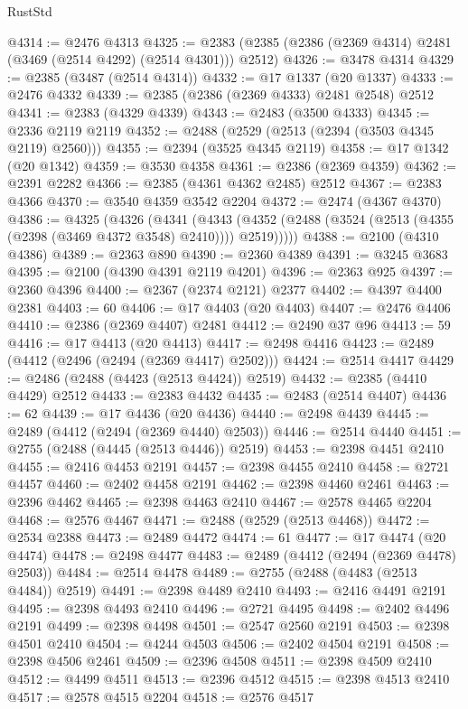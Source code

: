 \begin{lexlean}{RustStd}
\begin{coremodule}
@4314 := @2476 @4313
@4325 := @2383 (@2385 (@2386 (@2369 @4314) @2481 (@3469 (@2514 @4292) (@2514 @4301))) @2512)
@4326 := @3478 @4314
@4329 := @2385 (@3487 (@2514 @4314))
@4332 := @17 @1337 (@20 @1337)
@4333 := @2476 @4332
@4339 := @2385 (@2386 (@2369 @4333) @2481 @2548) @2512
@4341 := @2383 (@4329 @4339)
@4343 := @2483 (@3500 @4333)
@4345 := @2336 @2119 @2119
@4352 := @2488 (@2529 (@2513 (@2394 (@3503 @4345 @2119) @2560)))
@4355 := @2394 (@3525 @4345 @2119)
@4358 := @17 @1342 (@20 @1342)
@4359 := @3530 @4358
@4361 := @2386 (@2369 @4359)
@4362 := @2391 @2282
@4366 := @2385 (@4361 @4362 @2485) @2512
@4367 := @2383 @4366
@4370 := @3540 @4359 @3542 @2204
@4372 := @2474 (@4367 @4370)
@4386 := @4325
    (@4326
      (@4341
        (@4343 (@4352 (@2488 (@3524 (@2513 (@4355 (@2398 (@3469 @4372 @3548) @2410)))) @2519)))))
@4388 := @2100 (@4310 @4386)
@4389 := @2363 @890
@4390 := @2360 @4389
@4391 := @3245 @3683
@4395 := @2100 (@4390 @4391 @2119 @4201)
@4396 := @2363 @925
@4397 := @2360 @4396
@4400 := @2367 (@2374 @2121) @2377
@4402 := @4397 @4400 @2381
@4403 := 60
@4406 := @17 @4403 (@20 @4403)
@4407 := @2476 @4406
@4410 := @2386 (@2369 @4407) @2481
@4412 := @2490 @37 @96
@4413 := 59
@4416 := @17 @4413 (@20 @4413)
@4417 := @2498 @4416
@4423 := @2489 (@4412 (@2496 (@2494 (@2369 @4417) @2502)))
@4424 := @2514 @4417
@4429 := @2486 (@2488 (@4423 (@2513 @4424)) @2519)
@4432 := @2385 (@4410 @4429) @2512
@4433 := @2383 @4432
@4435 := @2483 (@2514 @4407)
@4436 := 62
@4439 := @17 @4436 (@20 @4436)
@4440 := @2498 @4439
@4445 := @2489 (@4412 (@2494 (@2369 @4440) @2503))
@4446 := @2514 @4440
@4451 := @2755 (@2488 (@4445 (@2513 @4446)) @2519)
@4453 := @2398 @4451 @2410
@4455 := @2416 @4453 @2191
@4457 := @2398 @4455 @2410
@4458 := @2721 @4457
@4460 := @2402 @4458 @2191
@4462 := @2398 @4460 @2461
@4463 := @2396 @4462
@4465 := @2398 @4463 @2410
@4467 := @2578 @4465 @2204
@4468 := @2576 @4467
@4471 := @2488 (@2529 (@2513 @4468))
@4472 := @2534 @2388
@4473 := @2489 @4472
@4474 := 61
@4477 := @17 @4474 (@20 @4474)
@4478 := @2498 @4477
@4483 := @2489 (@4412 (@2494 (@2369 @4478) @2503))
@4484 := @2514 @4478
@4489 := @2755 (@2488 (@4483 (@2513 @4484)) @2519)
@4491 := @2398 @4489 @2410
@4493 := @2416 @4491 @2191
@4495 := @2398 @4493 @2410
@4496 := @2721 @4495
@4498 := @2402 @4496 @2191
@4499 := @2398 @4498
@4501 := @2547 @2560 @2191
@4503 := @2398 @4501 @2410
@4504 := @4244 @4503
@4506 := @2402 @4504 @2191
@4508 := @2398 @4506 @2461
@4509 := @2396 @4508
@4511 := @2398 @4509 @2410
@4512 := @4499 @4511
@4513 := @2396 @4512
@4515 := @2398 @4513 @2410
@4517 := @2578 @4515 @2204
@4518 := @2576 @4517

\end{coremodule}
\end{lexlean}
